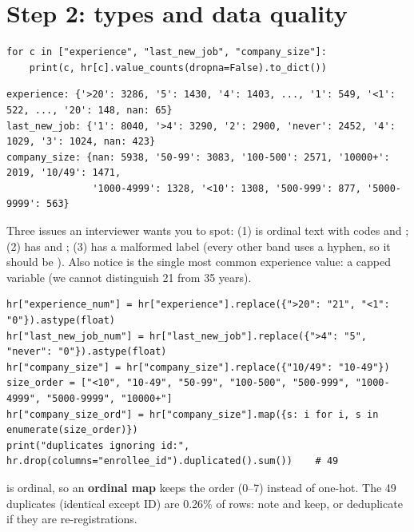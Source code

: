 \section{Step 2: types and data quality}
\begin{lstlisting}
for c in ["experience", "last_new_job", "company_size"]:
    print(c, hr[c].value_counts(dropna=False).to_dict())
\end{lstlisting}
\outlabel
\begin{lstlisting}[style=out]
experience: {'>20': 3286, '5': 1430, '4': 1403, ..., '1': 549, '<1': 522, ..., '20': 148, nan: 65}
last_new_job: {'1': 8040, '>4': 3290, '2': 2900, 'never': 2452, '4': 1029, '3': 1024, nan: 423}
company_size: {nan: 5938, '50-99': 3083, '100-500': 2571, '10000+': 2019, '10/49': 1471,
               '1000-4999': 1328, '<10': 1308, '500-999': 877, '5000-9999': 563}
\end{lstlisting}
Three issues an interviewer wants you to spot: (1)  is ordinal text with codes  and ; (2)  has  and ; (3)
 has a malformed label  (every other band uses a hyphen, so it should be ). Also notice  is the single most common experience value:
a capped variable (we cannot distinguish 21 from 35 years).
\begin{lstlisting}
hr["experience_num"] = hr["experience"].replace({">20": "21", "<1": "0"}).astype(float)
hr["last_new_job_num"] = hr["last_new_job"].replace({">4": "5", "never": "0"}).astype(float)
hr["company_size"] = hr["company_size"].replace({"10/49": "10-49"})
size_order = ["<10", "10-49", "50-99", "100-500", "500-999", "1000-4999", "5000-9999", "10000+"]
hr["company_size_ord"] = hr["company_size"].map({s: i for i, s in enumerate(size_order)})
print("duplicates ignoring id:", hr.drop(columns="enrollee_id").duplicated().sum())    # 49
\end{lstlisting}
 is ordinal, so an \textbf{ordinal map} keeps the order (0--7) instead of one-hot. The 49 duplicates (identical except ID) are 0.26\% of rows: note and keep,
or deduplicate if they are re-registrations.

